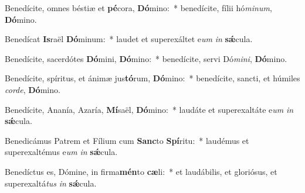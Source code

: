 \item Benedícite, omnes béstiæ et \textbf{pé}cora, \textbf{Dó}mino:~* benedícite, fílii hó\textit{minum}, \textbf{Dó}mino.

\item Benedícat \textbf{Is}raël \textbf{Dó}minum:~* laudet et superexáltet e\textit{um} \textit{in} \textbf{sǽ}cula.

\item Benedícite, sacerdótes \textbf{Dó}mini, \textbf{Dó}mino:~* benedícite, servi Dó\textit{mini}, \textbf{Dó}mino.

\item Benedícite, spíritus, et ánimæ jus\textbf{tó}rum, \textbf{Dó}mino:~* benedícite, sancti, et húmiles \textit{corde}, \textbf{Dó}mino.

\item Benedícite, Ananía, Azaría, \textbf{Mí}saël, \textbf{Dó}mino:~* laudáte et superexaltáte e\textit{um} \textit{in} \textbf{sǽ}cula.

\item Benedicámus Patrem et Fílium cum \textbf{Sanc}to \textbf{Spí}ritu:~* laudémus et superexaltémus e\textit{um} \textit{in} \textbf{sǽ}cula.

\item Benedíctus es, Dómine, in firma\textbf{mén}to \textbf{cæ}li:~* et laudábilis, et gloriósus, et superexaltá\textit{tus} \textit{in} \textbf{sǽ}cula.
